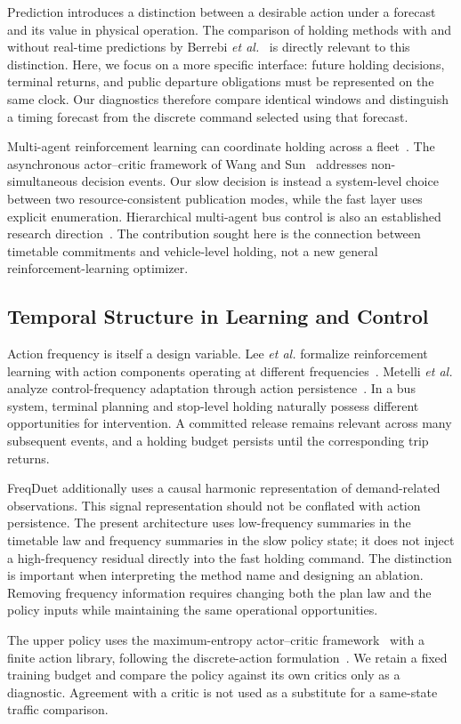 Prediction introduces a distinction between a desirable action under a forecast and its value in physical operation. The comparison of holding methods with and without real-time predictions by Berrebi \emph{et al.}~\cite{berrebi2018comparing} is directly relevant to this distinction. Here, we focus on a more specific interface: future holding decisions, terminal returns, and public departure obligations must be represented on the same clock. Our diagnostics therefore compare identical windows and distinguish a timing forecast from the discrete command selected using that forecast.

Multi-agent reinforcement learning can coordinate holding across a fleet~\cite{wang2020dynamic}. The asynchronous actor--critic framework of Wang and Sun~\cite{wang2021asynchronous} addresses non-simultaneous decision events. Our slow decision is instead a system-level choice between two resource-consistent publication modes, while the fast layer uses explicit enumeration. Hierarchical multi-agent bus control is also an established research direction~\cite{yu2024hierarchical}. The contribution sought here is the connection between timetable commitments and vehicle-level holding, not a new general reinforcement-learning optimizer.

\subsection{Temporal Structure in Learning and Control}
Action frequency is itself a design variable. Lee \emph{et al.} formalize reinforcement learning with action components operating at different frequencies~\cite{lee2020multiple}. Metelli \emph{et al.} analyze control-frequency adaptation through action persistence~\cite{metelli2020persistence}. In a bus system, terminal planning and stop-level holding naturally possess different opportunities for intervention. A committed release remains relevant across many subsequent events, and a holding budget persists until the corresponding trip returns.

FreqDuet additionally uses a causal harmonic representation of demand-related observations. This signal representation should not be conflated with action persistence. The present architecture uses low-frequency summaries in the timetable law and frequency summaries in the slow policy state; it does not inject a high-frequency residual directly into the fast holding command. The distinction is important when interpreting the method name and designing an ablation. Removing frequency information requires changing both the plan law and the policy inputs while maintaining the same operational opportunities.

The upper policy uses the maximum-entropy actor--critic framework~\cite{haarnoja2018sac} with a finite action library, following the discrete-action formulation~\cite{christodoulou2019discrete}. We retain a fixed training budget and compare the policy against its own critics only as a diagnostic. Agreement with a critic is not used as a substitute for a same-state traffic comparison.
